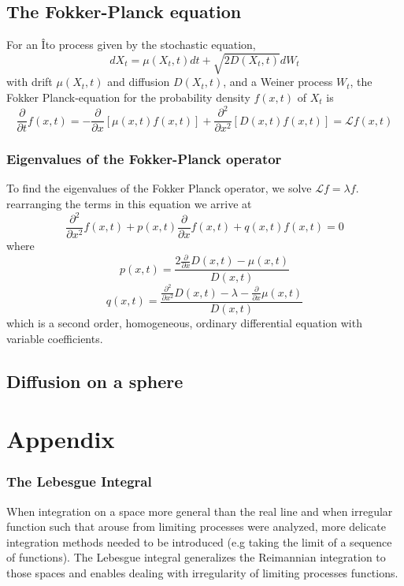\documentclass[12pt]{book}
\begin{document}
\section{The Fokker-Planck equation}\label{section:theFokkerPlanckEquation}
For an \^{I}to process given by the stochastic equation, 
\begin{equation*}
dX_t=\mu(X_t,t)dt+\sqrt{2D(X_t,t)}dW_t
\end{equation*}
with drift $\mu(X_t,t)$ and diffusion $D(X_t,t)$, and a Weiner process $W_t$, the Fokker Planck-equation for the probability density $f(x,t)$ of $X_t$ is 
\begin{equation*}
\frac{\partial}{\partial t}f(x,t)=-\frac{\partial}{\partial x}[\mu(x,t)f(x,t)]+\frac{\partial^2}{\partial x^2}[D(x,t)f(x,t)]=\mathcal{L}f(x,t)
\end{equation*}
\subsection{Eigenvalues of the Fokker-Planck operator }\label{subsection:eigenvaluesOfTheFokkerPlanckOperator}
To find the eigenvalues of the Fokker Planck operator, we solve $\mathcal{L}f = \lambda f$.
rearranging the terms in this equation we arrive at 
\begin{equation*}
\frac{\partial^2}{\partial x^2}f(x,t) +p(x,t)\frac{\partial}{\partial x}f(x,t) +q(x,t)f(x,t) = 0
\end{equation*}
where 
\begin{equation*}
p(x,t) = \frac{2\frac{\partial}{\partial x}D(x,t)-\mu(x,t)}{D(x,t)}
\end{equation*}
\begin{equation*}
q(x,t)=\frac{\frac{\partial^2}{\partial x^2}D(x,t)-\lambda-\frac{\partial}{\partial x}\mu(x,t)}{D(x,t)}
\end{equation*}
which is a second order, homogeneous, ordinary differential equation with variable coefficients. 

\section{Diffusion on a sphere}

\chapter{Appendix}
\subsection{The Lebesgue Integral}\label{appendix:theLebesgueIntegral}
When integration on a space more general than the real line and when irregular function such that arouse from limiting processes were analyzed, more delicate integration methods needed to be introduced (e.g taking the limit of  a sequence of functions). The Lebesgue integral generalizes the Reimannian integration to those spaces and enables dealing with irregularity of limiting processes functions. 

\end{document}
